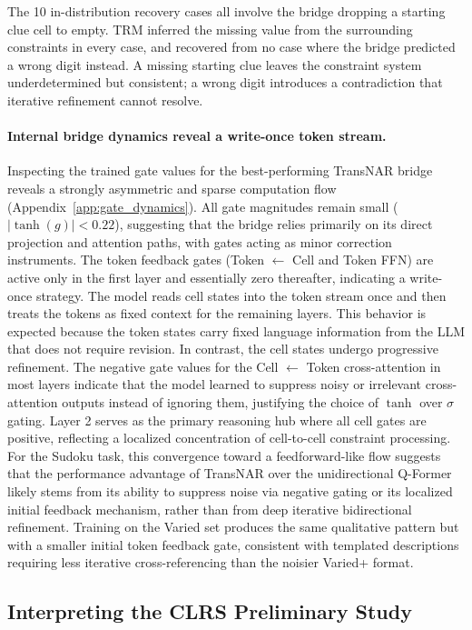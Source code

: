 \documentclass[11pt]{article}
\begin{document}
The 10 in-distribution recovery cases all involve the bridge dropping a starting clue cell to empty.
TRM inferred the missing value from the surrounding constraints in every case, and recovered from no case where the bridge predicted a wrong digit instead.
A missing starting clue leaves the constraint system underdetermined but consistent; a wrong digit introduces a contradiction that iterative refinement cannot resolve.

\paragraph{Internal bridge dynamics reveal a write-once token stream.}
Inspecting the trained gate values for the best-performing TransNAR bridge reveals a strongly asymmetric and sparse computation flow (Appendix~\ref{app:gate_dynamics}).
All gate magnitudes remain small ($|\tanh(g)| < 0.22$), suggesting that the bridge relies primarily on its direct projection and attention paths, with gates acting as minor correction instruments.
The token feedback gates (Token $\leftarrow$ Cell and Token FFN) are active only in the first layer and essentially zero thereafter, indicating a write-once strategy.
The model reads cell states into the token stream once and then treats the tokens as fixed context for the remaining layers.
This behavior is expected because the token states carry fixed language information from the LLM that does not require revision.
In contrast, the cell states undergo progressive refinement.
The negative gate values for the Cell $\leftarrow$ Token cross-attention in most layers indicate that the model learned to suppress noisy or irrelevant cross-attention outputs instead of ignoring them, justifying the choice of $\tanh$ over $\sigma$ gating.
Layer 2 serves as the primary reasoning hub where all cell gates are positive, reflecting a localized concentration of cell-to-cell constraint processing.
For the Sudoku task, this convergence toward a feedforward-like flow suggests that the performance advantage of TransNAR over the unidirectional Q-Former likely stems from its ability to suppress noise via negative gating or its localized initial feedback mechanism, rather than from deep iterative bidirectional refinement.
Training on the Varied set produces the same qualitative pattern but with a smaller initial token feedback gate, consistent with templated descriptions requiring less iterative cross-referencing than the noisier Varied+ format.


\subsection{Interpreting the CLRS Preliminary Study}
\label{sec:clrs_preliminary_analysis}
\label{sec:clrs_pilot_experiments}
\end{document}
